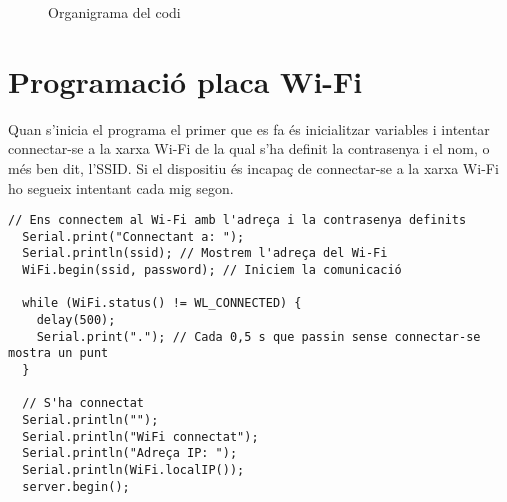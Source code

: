 \begin{spacing}{1.5}
\begin{figure}[H]
\begin{center}
\end{center}
\caption{Organigrama del codi}
\label{fig:organigrama}
\end{figure}

%
\section{Programació placa Wi-Fi}

\noindent Quan s'inicia el programa el primer que es fa és inicialitzar variables i intentar connectar-se a la xarxa Wi-Fi de la qual s'ha definit la contrasenya i el nom, o més ben dit, l'SSID. Si el dispositiu és incapaç de connectar-se a la xarxa Wi-Fi ho segueix intentant cada mig segon.
\end{spacing}
\begin{spacing}{1}
\begin{lstlisting}[style=myArduino]
  // Ens connectem al Wi-Fi amb l'adreça i la contrasenya definits
  Serial.print("Connectant a: ");
  Serial.println(ssid); // Mostrem l'adreça del Wi-Fi
  WiFi.begin(ssid, password); // Iniciem la comunicació
  
  while (WiFi.status() != WL_CONNECTED) {
    delay(500);
    Serial.print("."); // Cada 0,5 s que passin sense connectar-se mostra un punt
  }
  
  // S'ha connectat
  Serial.println("");
  Serial.println("WiFi connectat");
  Serial.println("Adreça IP: ");
  Serial.println(WiFi.localIP());
  server.begin();
\end{lstlisting}

\end{spacing}
